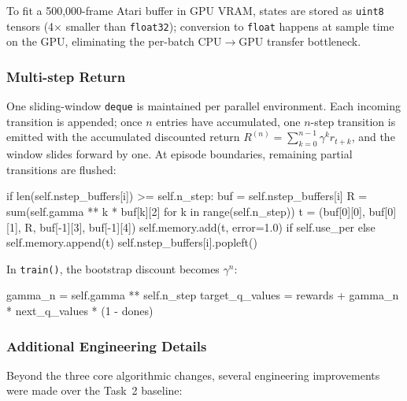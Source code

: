 \documentclass[12pt,a4paper]{report}
\begin{document}
To fit a 500{,}000-frame Atari buffer in GPU VRAM, states are stored as
\texttt{uint8} tensors (4$\times$ smaller than \texttt{float32});
conversion to \texttt{float} happens at sample time on the GPU, eliminating
the per-batch CPU$\to$GPU transfer bottleneck.

\subsubsection*{Multi-step Return}

One sliding-window \texttt{deque} is maintained per parallel environment.
Each incoming transition is appended; once $n$ entries have accumulated,
one $n$-step transition is emitted with the accumulated discounted return
$R^{(n)} = \sum_{k=0}^{n-1} \gamma^k r_{t+k}$, and the window slides forward by one.
At episode boundaries, remaining partial transitions are flushed:

\begin{pycode}
if len(self.nstep_buffers[i]) >= self.n_step:
    buf = self.nstep_buffers[i]
    R   = sum(self.gamma ** k * buf[k][2] for k in range(self.n_step))
    t   = (buf[0][0], buf[0][1], R, buf[-1][3], buf[-1][4])
    self.memory.add(t, error=1.0) if self.use_per else self.memory.append(t)
    self.nstep_buffers[i].popleft()
\end{pycode}

In \texttt{train()}, the bootstrap discount becomes $\gamma^n$:

\begin{pycode}
gamma_n         = self.gamma ** self.n_step
target_q_values = rewards + gamma_n * next_q_values * (1 - dones)
\end{pycode}

\subsubsection*{Additional Engineering Details}

Beyond the three core algorithmic changes, several engineering improvements
were made over the Task~2 baseline:
\end{document}
